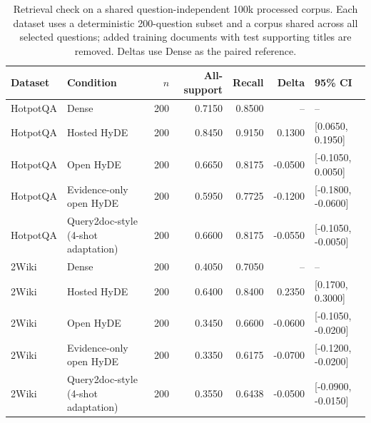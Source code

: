 \begin{table}[htbp]
\centering
\caption{Retrieval check on a shared question-independent 100k processed corpus. Each dataset uses a deterministic 200-question subset and a corpus shared across all selected questions; added training documents with test supporting titles are removed. Deltas use Dense as the paired reference.}
\label{tab:shared_corpus_check}
\footnotesize
\setlength{\tabcolsep}{1.5pt}
\begin{tabular}{llrrrrl}
\toprule
Dataset & Condition & $n$ & All-support & Recall & Delta & 95\% CI \\
\midrule
HotpotQA & Dense & 200 & 0.7150 & 0.8500 & -- & -- \\
HotpotQA & Hosted HyDE & 200 & 0.8450 & 0.9150 & 0.1300 & [0.0650, 0.1950] \\
HotpotQA & Open HyDE & 200 & 0.6650 & 0.8175 & -0.0500 & [-0.1050, 0.0050] \\
HotpotQA & Evidence-only open HyDE & 200 & 0.5950 & 0.7725 & -0.1200 & [-0.1800, -0.0600] \\
HotpotQA & Query2doc-style (4-shot adaptation) & 200 & 0.6600 & 0.8175 & -0.0550 & [-0.1050, -0.0050] \\
\midrule
2Wiki & Dense & 200 & 0.4050 & 0.7050 & -- & -- \\
2Wiki & Hosted HyDE & 200 & 0.6400 & 0.8400 & 0.2350 & [0.1700, 0.3000] \\
2Wiki & Open HyDE & 200 & 0.3450 & 0.6600 & -0.0600 & [-0.1050, -0.0200] \\
2Wiki & Evidence-only open HyDE & 200 & 0.3350 & 0.6175 & -0.0700 & [-0.1200, -0.0200] \\
2Wiki & Query2doc-style (4-shot adaptation) & 200 & 0.3550 & 0.6438 & -0.0500 & [-0.0900, -0.0150] \\
\bottomrule
\end{tabular}
\end{table}
